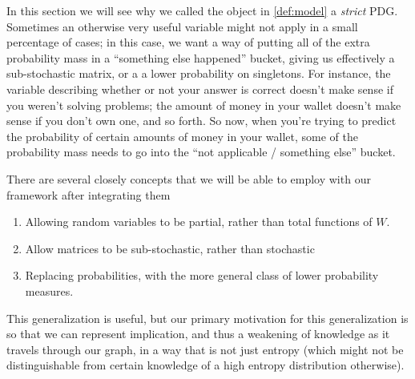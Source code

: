 \documentclass{article}
\newcommand{\MN}{PDG}
\begin{document}
	In this section we will see why we called the object in \cref{def:model} a \textit{strict} \MN.	
	Sometimes an otherwise very useful variable might not apply in a small percentage of cases; in this case, we want a way of putting all of the extra probability mass in a ``something else happened'' bucket, giving us effectively a sub-stochastic matrix, or a a lower probability on singletons. For instance, the variable describing whether or not your answer is correct doesn't make sense if you weren't solving problems; the amount of money in your wallet doesn't make sense if you don't own one, and so forth. So now, when you're trying to predict the probability of certain amounts of money in your wallet, some of the probability mass needs to go into the ``not applicable / something else'' bucket. 
	
	There are several closely concepts that we will be able to employ with our framework after integrating them
	\begin{enumerate}[nosep]
		\item Allowing random variables to be partial, rather than total functions of $W$. 
		\item Allow matrices to be sub-stochastic, rather than stochastic
		\item Replacing probabilities, with the more general class of lower probability measures.
	\end{enumerate}

	This generalization is useful, but our primary motivation for this generalization is so that we can represent implication, and thus a weakening of knowledge as it travels through our graph, in a way that is not just entropy (which might not be distinguishable from certain knowledge of a high entropy distribution otherwise). 
\end{document}
